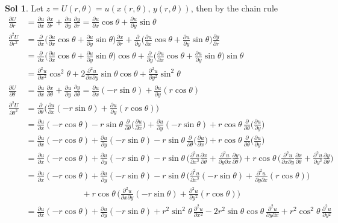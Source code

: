 \documentclass[12pt]{extarticle}
\newcommand{\ds}{\displaystyle}
\theoremstyle{definition}
\newtheorem*{sol}{Sol}
\newcommand{\pdiff}[2]{\frac{\partial #1}{\partial #2}}
\newcommand{\pdifft}[2]{\frac{\partial^2 #1}{\partial #2^2}}
\begin{document}
\begin{sol}
  Let $\ds z = U(r, \theta) = u(x(r, \theta),\,y(r,\theta))$, then by the chain rule 
  \begin{align*}
    \pdiff{U}{r} &= \pdiff{u}{x}\,\pdiff{x}{r} + \pdiff{u}{y}\,\pdiff{y}{r} = \pdiff{u}{x}\cos\theta + \pdiff{u}{y}\sin\theta \\
    \pdifft{U}{r} &= \pdiff{}{x}\bigg(\pdiff{u}{x}\cos\theta + \pdiff{u}{y}\sin\theta\bigg)\pdiff{x}{r} + \pdiff{}{y}\bigg(\pdiff{u}{x}\cos\theta + \pdiff{u}{y}\sin\theta\bigg)\pdiff{y}{r} \\
    &= \pdiff{}{x}\bigg(\pdiff{u}{x}\cos\theta + \pdiff{u}{y}\sin\theta\bigg)\cos\theta + \pdiff{}{y}\bigg(\pdiff{u}{x}\cos\theta + \pdiff{u}{y}\sin\theta\bigg)\sin\theta \\
    &= \pdifft{u}{x}\cos^2\theta + 2\frac{\partial^2 u}{\partial x\partial y}\sin\theta\cos\theta + \pdifft{u}{y}\sin^2\theta \\
    \pdiff{U}{\theta} &= \pdiff{u}{x}\,\pdiff{x}{\theta} + \pdiff{u}{y}\,\pdiff{y}{\theta} = \pdiff{u}{x}(-r\sin\theta) + \pdiff{u}{y}(r\cos\theta) \\
    \pdifft{U}{\theta} &= \pdiff{}{\theta}\bigg(\pdiff{u}{x}(-r\sin\theta) + \pdiff{u}{y}(r\cos\theta)\bigg) \\
    &= \pdiff{u}{x}(-r\cos\theta) - r\sin\theta\,\pdiff{}{\theta}\bigg(\pdiff{u}{x}\bigg) + \pdiff{u}{y}(-r\sin\theta) + r\cos\theta\,\pdiff{}{\theta}\bigg(\pdiff{u}{y}\bigg) \\
    &= \pdiff{u}{x}(-r\cos\theta) + \pdiff{u}{y}(-r\sin\theta) - r\sin\theta\,\pdiff{}{\theta}\bigg(\pdiff{u}{x}\bigg) + r\cos\theta\,\pdiff{}{\theta}\bigg(\pdiff{u}{y}\bigg) \\
    &= \pdiff{u}{x}(-r\cos\theta) + \pdiff{u}{y}(-r\sin\theta) - r\sin\theta\,\bigg(\pdifft{u}{x}\pdiff{x}{\theta} + \frac{\partial^2 u}{\partial y\partial x}\pdiff{y}{\theta}\bigg) + r\cos\theta\,\bigg(\frac{\partial^2 u}{\partial x\partial y}\pdiff{x}{\theta} + \pdifft{u}{y}\pdiff{y}{\theta}\bigg) \\
    &= \pdiff{u}{x}(-r\cos\theta) + \pdiff{u}{y}(-r\sin\theta) - r\sin\theta\,\bigg(\pdifft{u}{x}(-r\sin\theta) + \frac{\partial^2 u}{\partial y\partial x}(r\cos\theta)\bigg) \\
    &\qquad\qquad\qquad\;\,\,+ r\cos\theta\,\bigg(\frac{\partial^2 u}{\partial x\partial y}(-r\sin\theta) + \pdifft{u}{y}(r\cos\theta)\bigg) \\
    &= \pdiff{u}{x}(-r\cos\theta) + \pdiff{u}{y}(-r\sin\theta) + r^2\sin^2\theta\,\pdifft{u}{x} -2r^2\sin\theta\cos\theta\,\frac{\partial^2 u}{\partial y\partial x} + r^2\cos^2\theta\,\pdifft{u}{y}

\end{align*}
\end{sol}
\end{document}
